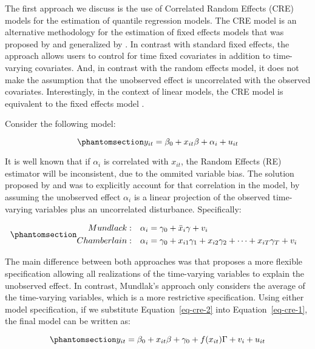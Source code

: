 \documentclass[bib]{statapress}
\begin{document}
The first approach we discuss is the use of Correlated Random Effects
(CRE) models for the estimation of quantile regression models. The CRE
model is an alternative methodology for the estimation of fixed effects
models that was proposed by \citet{mundlak1978} and generalized by
\citet{chamberlain1982}. In contrast with standard fixed effects, the
approach allows users to control for time fixed covariates in addition
to time-varying covariates. And, in contrast with the random effects
model, it does not make the assumption that the unobserved effect is
uncorrelated with the observed covariates. Interestingly, in the context
of linear models, the CRE model is equivalent to the fixed effects model
\citep{wooldridge2010}.

Consider the following model:

\begin{equation}\phantomsection\label{eq-cre-1}{y_{it} = \beta_0 + x_{it}\beta  + \alpha_i + u_{it}
}\end{equation}

It is well known that if \(\alpha_i\) is correlated with \(x_{it}\), the
Random Effects (RE) estimator will be inconsistent, due to the ommited
variable bias. The solution proposed by \citet{mundlak1978} and
\citet{chamberlain1982} was to explicitly account for that correlation
in the model, by assuming the unobserved effect \(\alpha_i\) is a linear
projection of the observed time-varying variables plus an uncorrelated
disturbance. Specifically:

\begin{equation}\phantomsection\label{eq-cre-2}{\begin{aligned}
Mundlack:  & & \alpha_i &= \gamma_0 + \bar x_{i}\gamma + v_i&  \\
Chamberlain: & & \alpha_i &= \gamma_0 + x_{i1}\gamma_1 + x_{i2}\gamma_2 + \dots + x_{iT}\gamma_T + v_i 
\end{aligned}
}\end{equation}

The main difference between both approaches was that
\citet{chamberlain1982} proposes a more flexible specification allowing
all realizations of the time-varying variables to explain the unobserved
effect. In contrast, Mundlak's approach only considers the average of
the time-varying variables, which is a more restrictive specification.
Using either model specification, if we substitute
Equation~\ref{eq-cre-2} into Equation~\ref{eq-cre-1}, the final model
can be written as:

\begin{equation}\phantomsection\label{eq-cre-final}{y_{it} = \beta_0 + x_{it}\beta  + \gamma_0 + f(x_{it})\Gamma + v_i + u_{it}
}\end{equation}
\end{document}
